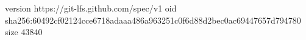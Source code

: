 version https://git-lfs.github.com/spec/v1
oid sha256:60492cf02124cce6718adaaa486a963251c0f6d88d2bec0ac69447657d794780
size 43840
